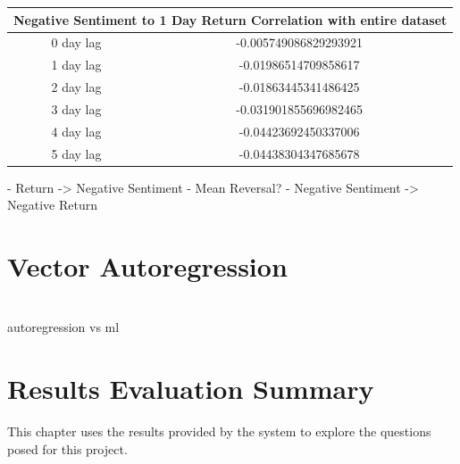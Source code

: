 \begin{center}
\begin{tabular}{ c c }
\hline
\multicolumn{2}{|c|}{Negative Sentiment to 1 Day Return Correlation with entire dataset} \\
\hline
0 day lag & -0.005749086829293921 \\
1 day lag & -0.01986514709858617 \\
2 day lag & -0.01863445341486425 \\
3 day lag & -0.031901855696982465 \\
4 day lag & -0.04423692450337006 \\
5 day lag & -0.04438304347685678
\end{tabular}
\end{center}

- Return -> Negative Sentiment
    - Mean Reversal?
- Negative Sentiment -> Negative Return

\section{Vector Autoregression}

\section{}
autoregression vs ml

\section{Results Evaluation Summary}

This chapter uses the results provided by the system to explore the questions posed for this project.